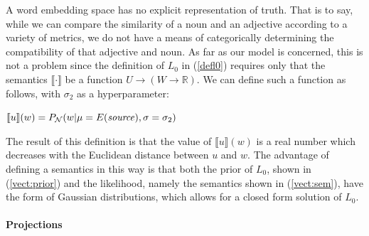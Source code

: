 \documentclass[9pt,twocolumn,twoside,lineno]{pnas-new}
\newcommand{\Listener}{L}
\newcommand{\QLONE}{\Listener_{{1}}^{{Q}}}
\begin{document}

		A word embedding space has no explicit representation of truth. That is to say, while we can compare the similarity of a noun and an adjective according to a variety of metrics, we do not have a means of categorically determining the compatibility of that adjective and noun. As far as our model is concerned, this is not a problem since the definition of $L_0$ in (\ref{defl0}) requires only that the semantics $\llbracket \cdot \rrbracket$ be a function $U\to (W\to \mathbb{R})$. We can define such a function as follows, with $\sigma_2$ as a hyperparameter:
		\begin{examples}
		
		\item $\llbracket u\rrbracket(w) = P_{\mathcal{N}}(w\vert\mu=E(\textrm{\emph{source}}),\sigma=\sigma_2)$ \label{vect:sem}
		\end{examples}





		The result of this definition is that the value of $\llbracket u\rrbracket(w)$ is a real number which decreases with the Euclidean distance between $u$ and $w$. 
		The advantage of defining a semantics in this way is that both the prior of $L_0$, shown in (\ref{vect:prior}) and the likelihood, namely the semantics shown in (\ref{vect:sem}), have the form of Gaussian distributions, which allows for a closed form solution of $L_0$. 

	\paragraph{Projections} 
\end{document}
